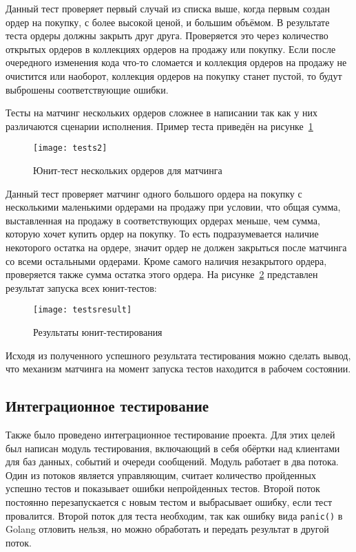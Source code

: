 Данный тест проверяет первый случай из списка выше, когда первым создан ордер на покупку, с более высокой ценой, и большим объёмом. В результате теста ордеры должны закрыть друг друга. Проверяется это через количество открытых ордеров в коллекциях ордеров на продажу или покупку. Если после очередного изменения кода что-то сломается и коллекция ордеров на продажу не очистится или наоборот, коллекция ордеров на покупку станет пустой, то будут выброшены соответствующие ошибки.

Тесты на матчинг нескольких ордеров сложнее в написании так как у них различаются сценарии исполнения. Пример теста приведён на рисунке~\ref{fig:unit_test2}

\begin{figure}[ht]
    \centering
    \texttt{[image: tests2]}
    \caption{Юнит-тест нескольких ордеров для матчинга}\label{fig:unit_test2}
\end{figure}

Данный тест проверяет матчинг одного большого ордера на покупку с несколькими маленькими ордерами на продажу при условии, что общая сумма, выставленная на продажу в соответствующих ордерах меньше, чем сумма, которую хочет купить ордер на покупку. То есть подразумевается наличие некоторого остатка на ордере, значит ордер не должен закрыться после матчинга со всеми остальными ордерами. Кроме самого наличия незакрытого ордера, проверяется также сумма остатка этого ордера.
На рисунке~\ref{fig:testsresult} представлен результат запуска всех юнит-тестов:

\begin{figure}[ht]
    \centering
    \texttt{[image: testsresult]}
    \caption{Результаты юнит-тестирования}\label{fig:testsresult}
\end{figure}

Исходя из полученного успешного результата тестирования можно сделать вывод, что механизм матчинга на момент запуска тестов находится в рабочем состоянии.

\subsection{Интеграционное тестирование}

Также было проведено интеграционное тестирование проекта. Для этих целей был написан модуль тестирования, включающий в себя обёртки над клиентами для баз данных, событий и очереди сообщений. Модуль работает в два потока. Один из потоков является управляющим, считает количество пройденных успешно тестов и показывает ошибки непройденных тестов. Второй поток постоянно перезапускается с новым тестом и выбрасывает ошибку, если тест провалится. Второй поток для теста необходим, так как ошибку вида \lstinline[language=Golang]{panic()} в Golang отловить нельзя, но можно обработать и передать результат в другой поток.

